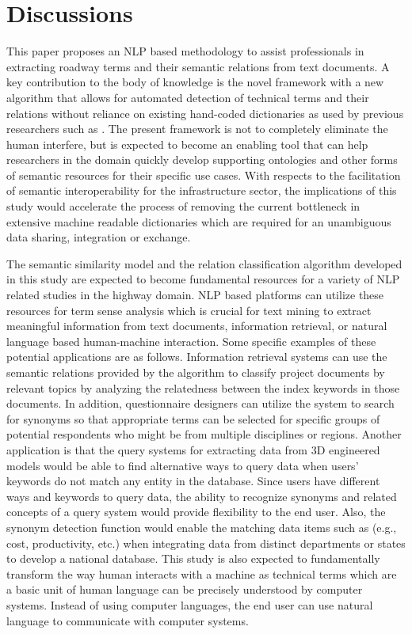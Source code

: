 \documentclass[Journal, BackFigs, DoubleSpace]{ascelike}%
\begin{document}
%
\section{Discussions} \label{sec:dis}
This paper proposes an NLP based methodology to assist professionals in extracting roadway terms and their semantic relations from text documents. A key contribution to the body of knowledge is the novel framework with a new algorithm that allows for automated detection of technical terms and their relations without reliance on existing hand-coded dictionaries as used by previous researchers such as . The present framework is not to completely eliminate the human interfere, but is expected to become an enabling tool that can help researchers in the domain quickly develop supporting ontologies and other forms of semantic resources for their specific use cases. With respects to the facilitation of semantic interoperability for the infrastructure sector, the implications of this study would accelerate the process of removing the current bottleneck in extensive machine readable dictionaries which are required for an unambiguous data sharing, integration or exchange. 
\par
The semantic similarity model and the relation classification algorithm developed in this study are expected to become fundamental resources for a variety of NLP related studies in the highway domain. NLP based platforms can utilize these resources for term sense analysis which is crucial for text mining to extract meaningful information from text documents, information retrieval, or natural language based human-machine interaction. Some specific examples of these potential applications are as follows. Information retrieval systems can use the semantic relations provided by the algorithm to classify project documents by relevant topics by analyzing the relatedness between the index keywords in those documents. In addition, questionnaire designers can utilize the system to search for synonyms so that appropriate terms can be selected for specific groups of potential respondents who might be from multiple disciplines or regions. Another application is that the query systems for extracting data from 3D engineered models would be able to find alternative ways to query data when users' keywords do not match any entity in the database. Since users have different ways and keywords to query data, the ability to recognize synonyms and related concepts of a query system would provide flexibility to the end user. Also, the synonym detection function would enable the matching data items such as (e.g., cost, productivity, etc.) when integrating data from distinct departments or states to develop a national database. This study is also expected to fundamentally transform the way human interacts with a machine as technical terms which are a basic unit of human language can be precisely understood by computer systems. Instead of using computer languages, the end user can use natural language to communicate with computer systems.
\end{document}
